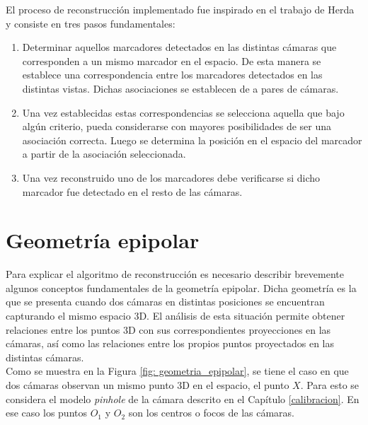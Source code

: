 El proceso de reconstrucción implementado fue inspirado en el trabajo de Herda \cite{herda} y consiste en tres pasos fundamentales:
\begin{enumerate}
\item Determinar aquellos marcadores detectados en las distintas cámaras que corresponden a un mismo marcador en el espacio. De esta manera se establece una correspondencia entre los marcadores detectados en las distintas vistas. Dichas asociaciones se establecen de a pares de cámaras.
\item Una vez establecidas estas correspondencias se selecciona aquella que bajo algún criterio, pueda considerarse con mayores posibilidades de ser una asociación correcta. Luego se determina la posición en el espacio del marcador a partir de la asociación seleccionada.
\item Una vez reconstruido uno de los marcadores debe verificarse si dicho marcador fue detectado en el resto de las cámaras.
\end{enumerate}


\section{Geometría epipolar}



Para explicar el algoritmo de reconstrucción es necesario describir brevemente algunos conceptos fundamentales de la geometría epipolar.  Dicha geometría es la que se presenta cuando dos cámaras en distintas posiciones se encuentran capturando el mismo espacio 3D. El análisis de esta situación permite obtener relaciones entre los puntos 3D con sus correspondientes proyecciones en las cámaras, así como las relaciones entre los propios puntos proyectados en las distintas cámaras\cite{cyganek}\cite{hartley}. \\


 Como se muestra en la Figura \ref{fig: geometria_epipolar}, se tiene el caso en que dos cámaras observan un mismo punto 3D en el espacio, el punto $X$. Para esto se considera el modelo \textit{pinhole} de la cámara  descrito en el Capítulo \ref{calibracion}. En ese caso los puntos $O_1$ y $O_2$ son los centros o focos de las cámaras.\\
 
